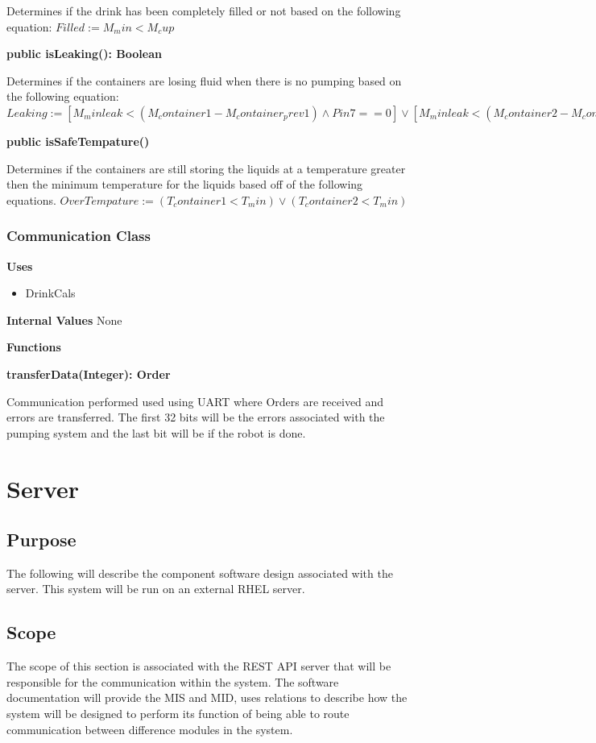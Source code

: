 \documentclass [10pt]{article}
\begin{document}
Determines if the drink has been completely filled or not based on the following equation:
$Filled := M_min < M_cup$

\textbf{public isLeaking(): Boolean}

Determines if the containers are losing fluid when there is no pumping based on the following equation:
$Leaking := [M_minleak < (M_container1 - M_container_prev1) \wedge Pin7 ==0] \vee [M_minleak < (M_container2 - M_container_prev2) \wedge Pin8 ==0] $

\textbf{public isSafeTempature()}

Determines if the containers are still storing the liquids at a temperature greater then the minimum temperature for the liquids based off of the following equations.
$OverTempature := (T_container1 < T_min) \vee (T_container2 < T_min)$ 


\subsubsection{Communication Class}

\textbf{Uses}

\begin{itemize}
	\item DrinkCals
\end{itemize}

\textbf{Internal Values}
 None

\textbf{Functions}

\textbf{transferData(Integer): Order}

Communication performed used using UART where Orders are received and errors are transferred. The first 32 bits will be the errors associated with the pumping system and the last bit will be if the robot is done.



\section {Server}
\subsection{Purpose}
The following will describe the component software design associated with the server. This system will be run on an external RHEL server.

\subsection{Scope}
The scope of this section is associated with the REST API server that will be responsible for the communication within the system. The software documentation will provide the MIS and MID, uses relations to describe how the system will be designed to perform its function of being able to route communication between difference modules in the system.
\end{document}

